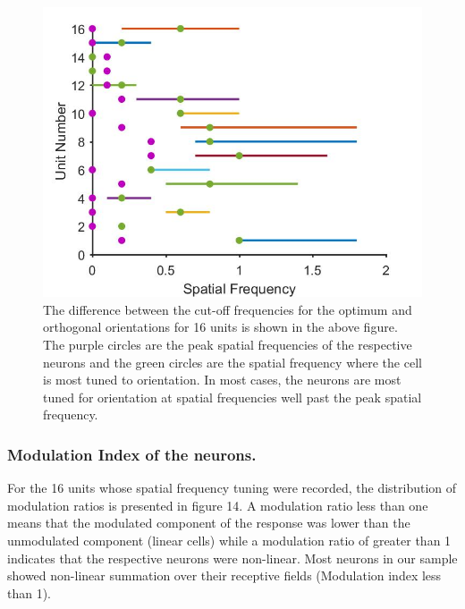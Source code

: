 		\begin{figure}[H]
		\includegraphics[width=\linewidth]{superiorcolliculus/sf_bandwidth.jpg}
		\caption{The difference between the cut-off frequencies for the optimum and orthogonal orientations for 16 units is shown in the above figure. The purple circles are the peak spatial frequencies of the respective neurons and the green circles are the spatial frequency where the cell is most tuned to orientation. In most cases, the neurons are most tuned for orientation at spatial frequencies well past the peak spatial frequency.}
		\label{fig:sf_bw}			
		\end{figure}
	
	\subsubsection{Modulation Index of the neurons.}
	
	For the 16 units whose spatial frequency tuning were recorded, the distribution of modulation ratios is presented in figure 14. A modulation ratio less than one means that the modulated component of the response was lower than the unmodulated component (linear cells) while a modulation ratio of greater than 1 indicates that the respective neurons were non-linear. Most neurons in our sample showed non-linear summation over their receptive fields (Modulation index less than 1). 
	
